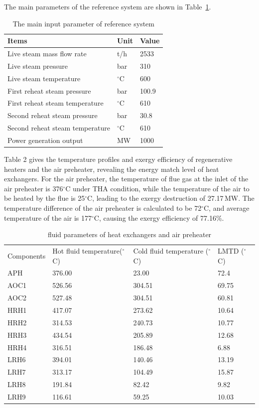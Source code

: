 \documentclass[preprint,12pt]{elsarticle}
\begin{document}
The main  parameters of the reference system are shown in Table~\ref{tab:ref input}.

\begin{table}[htbp]
\caption{The main input parameter of reference system }
\label{tab:ref input}
\centering
\begin{tabular}{lll}
\toprule 
Items & Unit & Value\tabularnewline
\midrule
 Live steam mass flow rate 	    	&t/h 			&2533 \\
 Live steam pressure 		    	&bar 			&310\\
 Live steam temperature		     	&$^\circ$C		&600		\\
 First reheat steam pressure    	&bar			&100.9		\\
 First reheat steam temperature  	&$^\circ$C		&610		\\
 Second reheat steam pressure    	&bar			&30.8		\\
 Second reheat steam temperature 	&$^\circ$C		&610		\\
 Power generation output 			&MW				&1000		\\
\bottomrule
\end{tabular}	
\end{table}
Table 2 gives the temperature profiles and exergy efficiency of regenerative heaters and the air preheater, revealing the energy match level of heat exchangers.
For the air preheater, the temperature of flue gas at the inlet of the air preheater is 376$^\circ$C under THA condition, while the temperature of the air to be heated by the flue is 25$^\circ$C, leading to the exergy destruction of 27.17\,MW. The temperature difference of the air preheater is calculated to be 72$^\circ$C, and average temperature of the air is 177$^\circ$C, causing the exergy efficiency of 77.16\%.
\begin{table}[htbp]
\caption{fluid parameters of heat exchangers and air preheater}
\label{tab:reheater parameter}
\centering
\begin{tabular}{llll}
\toprule 
\multirow{2}{2cm}{Components} &\multirow{2}{2.7cm}{Hot fluid temperature($^\circ$C)}  & \multirow{2}{3.2cm}{Cold fluid temperature ($^\circ$C)}&\multirow{2}{2.5cm}{LMTD ($^\circ$C)}\tabularnewline
&&&\tabularnewline
\midrule
APH  &  376.00 	& 23.00  & 72.4\tabularnewline
AOC1 &   526.56 & 304.51 & 69.75\tabularnewline
AOC2 &  527.48 	& 304.51 & 60.81\tabularnewline
HRH1 &   417.07 & 273.62 & 10.64\tabularnewline
HRH2 &   314.53 & 240.73 & 10.77\tabularnewline
HRH3 &   434.54 & 205.89 & 12.68\tabularnewline
HRH4 &   316.51 & 186.48 & 6.88\tabularnewline
LRH6 &  394.01 	& 140.46 & 13.19\tabularnewline
LRH7 &   313.17 & 104.49 & 15.87\tabularnewline
LRH8 &   191.84 & 82.42  & 9.82\tabularnewline
LRH9 &   116.61 & 59.25  & 10.03\tabularnewline
\bottomrule
\end{tabular}
\end{table}
\end{document}
